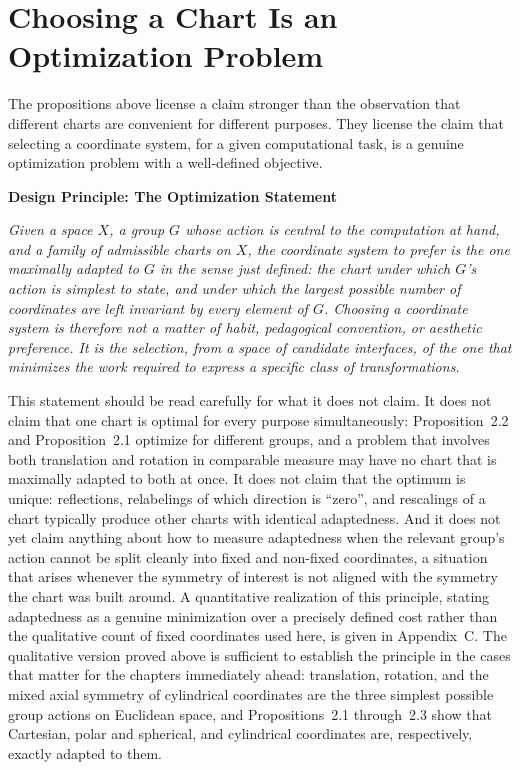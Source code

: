 \documentclass[11pt,fleqn]{book}
\numberwithin{equation}{chapter}
\newenvironment{principle}[1]
  {\begin{principleEnv}
   \noindent\textbf{Design Principle: #1}\par\smallskip\itshape}
  {\end{principleEnv}}
\theoremstyle{plain}
\theoremstyle{definition}
\theoremstyle{remark}
\providecommand{\enquote}[1]{``#1''}
\begin{document}
\section{Choosing a Chart Is an Optimization Problem}

The propositions above license a claim stronger than the observation that different charts are convenient for different purposes. They license the claim that selecting a coordinate system, for a given computational task, is a genuine optimization problem with a well-defined objective.

\begin{principle}{The Optimization Statement}
Given a space \(X\), a group \(G\) whose action is central to the computation at hand, and a family of admissible charts on \(X\), the coordinate system to prefer is the one maximally adapted to \(G\) in the sense just defined: the chart under which \(G\)'s action is simplest to state, and under which the largest possible number of coordinates are left invariant by every element of \(G\). Choosing a coordinate system is therefore not a matter of habit, pedagogical convention, or aesthetic preference. It is the selection, from a space of candidate interfaces, of the one that minimizes the work required to express a specific class of transformations.
\end{principle}

This statement should be read carefully for what it does not claim. It does not claim that one chart is optimal for every purpose simultaneously: Proposition~2.2 and Proposition~2.1 optimize for different groups, and a problem that involves both translation and rotation in comparable measure may have no chart that is maximally adapted to both at once. It does not claim that the optimum is unique: reflections, relabelings of which direction is \enquote{zero}, and rescalings of a chart typically produce other charts with identical adaptedness. And it does not yet claim anything about how to measure adaptedness when the relevant group's action cannot be split cleanly into fixed and non-fixed coordinates, a situation that arises whenever the symmetry of interest is not aligned with the symmetry the chart was built around. A quantitative realization of this principle, stating adaptedness as a genuine minimization over a precisely defined cost rather than the qualitative count of fixed coordinates used here, is given in Appendix~C. The qualitative version proved above is sufficient to establish the principle in the cases that matter for the chapters immediately ahead: translation, rotation, and the mixed axial symmetry of cylindrical coordinates are the three simplest possible group actions on Euclidean space, and Propositions~2.1 through~2.3 show that Cartesian, polar and spherical, and cylindrical coordinates are, respectively, exactly adapted to them.
\end{document}
